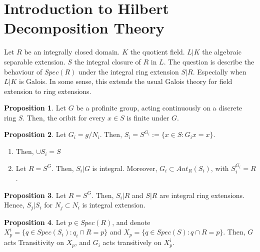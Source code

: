 \documentclass{article}
\theoremstyle{definition}
\theoremstyle{definition}
\theoremstyle{definition}
\newtheorem{proposition}{Proposition}[section]
\theoremstyle{definition}
\theoremstyle{definition}
\theoremstyle{definition}
\theoremstyle{definition}
\begin{document}
\section{Introduction to Hilbert Decomposition Theory}
Let $R$ be an integrally closed domain. $K$ the quotient field. $L|K$ the algebraic separable extension. $S$ the integral closure of $R$ in $L$. The question is describe the behaviour of $Spec(R)$ under the integral ring extension $S|R$. Especially when $L|K$ is Galois. In some sense, this extends the usual Galois theory for field extension to ring extensions. 


\begin{tcolorbox}[colback=blue!5!white,colframe=blue!30!white]
\begin{proposition}
    Let $G$ be a profinite group, acting continuously on a discrete ring $S$.  Then, the oribit for every $x\in S$ is finite under $G$. 
\end{proposition}
\end{tcolorbox}


\begin{tcolorbox}[colback=blue!5!white,colframe=blue!30!white]
\begin{proposition}
Let $G_i=g/N_i$. Then, $S_i=S^{G_i}:= \{ x\in S: G_ix=x \}$. 
\begin{enumerate}
    \item Then, $\cup S_i=S$
\item Let $R=S^G$. Then, $S_i|G$ is integral. Moreover, $G_i\subset Aut_R(S_i)$, with $S_i^{G_i}=R$.
\end{enumerate}
\end{proposition}
\end{tcolorbox}


\begin{tcolorbox}[colback=blue!5!white,colframe=blue!30!white]
\begin{proposition}
    Let $R=S^G$. Then, $S_i|R$ and $S|R$ are integral ring extensions. Hence, $S_j|S_i$ for $N_j\subset N_i$ is integral extension.
\end{proposition}
\end{tcolorbox}


\begin{tcolorbox}[colback=blue!5!white,colframe=blue!30!white]
\begin{proposition}
Let $p\in Spec(R)$, and denote $X^i_p=\{ q\in Spec(S_i):q_i\cap R=p \}$ and $X_p=\{ q\in Spec(S):q\cap R=p \}$. Then, $G$ acts Transitivity on $X_p$, and $G_i$ acts transitively on $X^i_p$.
 \end{proposition}
\end{tcolorbox}
\end{document}
